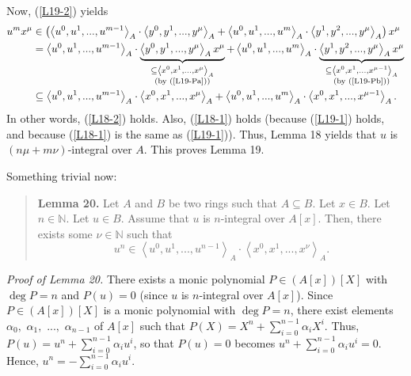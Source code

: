\documentclass[12pt,final,notitlepage,onecolumn]{article}%
\begin{document}
Now, (\ref{L19-2}) yields%
\begin{align*}
u^{m}x^{\mu}  &  \in\left(  \left\langle u^{0},u^{1},...,u^{m-1}\right\rangle
_{A}\cdot\left\langle y^{0},y^{1},...,y^{\mu}\right\rangle _{A}+\left\langle
u^{0},u^{1},...,u^{m}\right\rangle _{A}\cdot\left\langle y^{1},y^{2}%
,...,y^{\mu}\right\rangle _{A}\right)  x^{\mu}\\
&  =\left\langle u^{0},u^{1},...,u^{m-1}\right\rangle _{A}\cdot
\underbrace{\left\langle y^{0},y^{1},...,y^{\mu}\right\rangle _{A}x^{\mu}%
}_{\substack{\subseteq\left\langle x^{0},x^{1},...,x^{\mu}\right\rangle
_{A}\\\left(  \text{by (\ref{L19-Pa})}\right)  }}+\left\langle u^{0}%
,u^{1},...,u^{m}\right\rangle _{A}\cdot\underbrace{\left\langle y^{1}%
,y^{2},...,y^{\mu}\right\rangle _{A}x^{\mu}}_{\substack{\subseteq\left\langle
x^{0},x^{1},...,x^{\mu-1}\right\rangle _{A}\\\left(  \text{by (\ref{L19-Pb}%
)}\right)  }}\\
&  \subseteq\left\langle u^{0},u^{1},...,u^{m-1}\right\rangle _{A}%
\cdot\left\langle x^{0},x^{1},...,x^{\mu}\right\rangle _{A}+\left\langle
u^{0},u^{1},...,u^{m}\right\rangle _{A}\cdot\left\langle x^{0},x^{1}%
,...,x^{\mu-1}\right\rangle _{A}.
\end{align*}
In other words, (\ref{L18-2}) holds. Also, (\ref{L18-1}) holds (because
(\ref{L19-1}) holds, and because (\ref{L18-1}) is the same as (\ref{L19-1})).
Thus, Lemma 18 yields that $u$ is $\left(  n\mu+m\nu\right)  $-integral over
$A$. This proves Lemma 19.

Something trivial now:

\begin{quote}
\textbf{Lemma 20.} Let $A$ and $B$ be two rings such that $A\subseteq B$. Let
$x\in B$. Let $n\in\mathbb{N}$. Let $u\in B$. Assume that $u$ is $n$-integral
over $A\left[  x\right]  $. Then, there exists some $\nu\in\mathbb{N}$ such
that%
\[
u^{n}\in\left\langle u^{0},u^{1},...,u^{n-1}\right\rangle _{A}\cdot
\left\langle x^{0},x^{1},...,x^{\nu}\right\rangle _{A}.
\]



\end{quote}

\textit{Proof of Lemma 20.} There exists a monic polynomial $P\in\left(
A\left[  x\right]  \right)  \left[  X\right]  $ with $\deg P=n$ and $P\left(
u\right)  =0$ (since $u$ is $n$-integral over $A\left[  x\right]  $). Since
$P\in\left(  A\left[  x\right]  \right)  \left[  X\right]  $ is a monic
polynomial with $\deg P=n$, there exist elements $\alpha_{0},$ $\alpha_{1},$
$...,$ $\alpha_{n-1}$ of $A\left[  x\right]  $ such that $P\left(  X\right)
=X^{n}+\sum\limits_{i=0}^{n-1}\alpha_{i}X^{i}$. Thus, $P\left(  u\right)
=u^{n}+\sum\limits_{i=0}^{n-1}\alpha_{i}u^{i}$, so that $P\left(  u\right)
=0$ becomes $u^{n}+\sum\limits_{i=0}^{n-1}\alpha_{i}u^{i}=0$. Hence,
$u^{n}=-\sum\limits_{i=0}^{n-1}\alpha_{i}u^{i}$.
\end{document}
